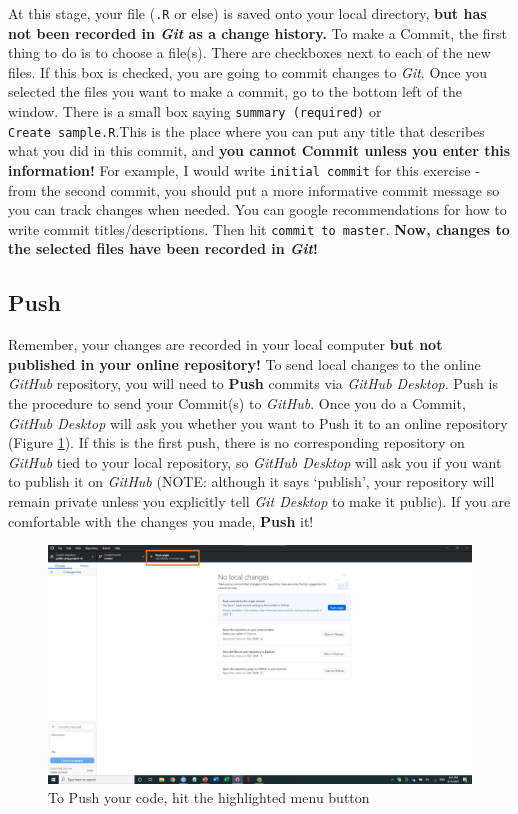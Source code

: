 \documentclass[
]{book}
\begin{document}
At this stage, your file (\texttt{.R} or else) is saved onto your local directory, \textbf{but has not been recorded in \emph{Git} as a change history.} To make a Commit, the first thing to do is to choose a file(s). There are checkboxes next to each of the new files. If this box is checked, you are going to commit changes to \emph{Git}. Once you selected the files you want to make a commit, go to the bottom left of the window. There is a small box saying \texttt{summary\ (required)} or \texttt{Create\ sample.R}.This is the place where you can put any title that describes what you did in this commit, and \textbf{you cannot Commit unless you enter this information!} For example, I would write \texttt{initial\ commit} for this exercise - from the second commit, you should put a more informative commit message so you can track changes when needed. You can google recommendations for how to write commit titles/descriptions. Then hit \texttt{commit\ to\ master}. \textbf{Now, changes to the selected files have been recorded in \emph{Git}!}

\hypertarget{push}{%
\subsection{Push}\label{push}}

Remember, your changes are recorded in your local computer \textbf{but not published in your online repository!} To send local changes to the online \emph{GitHub} repository, you will need to \textbf{Push} commits via \emph{GitHub Desktop}. Push is the procedure to send your Commit(s) to \emph{GitHub}. Once you do a Commit, \emph{GitHub Desktop} will ask you whether you want to Push it to an online repository (Figure \ref{fig:gitdesktop4}). If this is the first push, there is no corresponding repository on \emph{GitHub} tied to your local repository, so \emph{GitHub Desktop} will ask you if you want to publish it on \emph{GitHub} (NOTE: although it says `publish', your repository will remain private unless you explicitly tell \emph{Git Desktop} to make it public). If you are comfortable with the changes you made, \textbf{Push} it!

\begin{figure}

{\centering \includegraphics[width=61.11in]{image/git_image05} 

}

\caption{To Push your code, hit the highlighted menu button}\label{fig:gitdesktop4}
\end{figure}
\end{document}
